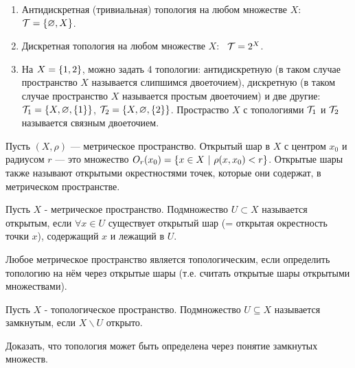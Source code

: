 \begin{example}
    \begin{enumerate}
        \item Антидискретная (тривиальная) топология на любом множестве $X$: \ $\mathcal{T} = \left\{\varnothing, X\right\}$.
        \item Дискретная топология на любом множестве $X$: \ $\mathcal{T} = 2^X$.
        \item На $X = \left\{1, 2\right\}$, можно задать 4 топологии: антидискретную (в таком случае пространство $X$ называется слипшимся двоеточием), дискретную (в таком случае пространство $X$ называется простым двоеточием) и две другие: \ $\mathcal{T}_1 = \left\{X, \varnothing, \left\{1\right\}\right\}$, $\mathcal{T}_2 = \left\{X, \varnothing, \left\{2\right\}\right\}$.
        Простраство $X$ с топологиями $\mathcal{T}_1$ и $\mathcal{T}_2$ называется связным двоеточием.
    \end{enumerate}
\end{example}

\begin{definition}
    Пусть $(X, \rho)$ --- метрическое пространство. Открытый шар в $X$ с центром $x_0$ и радиусом $r$ --- это множество $O_r(x_0) = \cbr{x \in X \ | \ \rho(x, x_0) < r}$. Открытые шары также называют открытыми окрестностями точек, которые они содержат, в метрическом пространстве.
\end{definition}

\begin{definition}
    Пусть $X$ - метрическое пространство. Подмножество $U \subset X$ называется открытым, если $\forall x \in U$ существует открытый шар (= открытая окрестность точки $x$), содержащий $x$ и лежащий в $U$. 
\end{definition}

\begin{nota_bene}
    Любое метрическое пространство является топологическим, если определить топологию на нём через открытые шары (т.е. считать открытые шары открытыми множествами).
\end{nota_bene}

\begin{definition}
    Пусть $X$ - топологическое пространство. Подмножество $U \subseteq X$ называется замкнутым, если $X \backslash U$ открыто.
\end{definition}

\begin{exercise}
    Доказать, что топология может быть определена через понятие замкнутых множеств.
\end{exercise}

